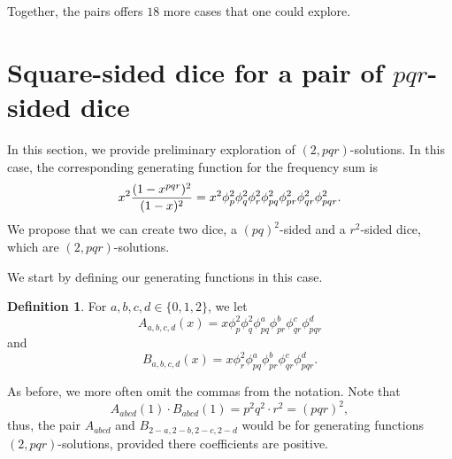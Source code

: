 \documentclass[11pt]{amsart}
\numberwithin{equation}{section}
\theoremstyle{plain}
\theoremstyle{definition}
\newtheorem{definition}[equation]{Definition}
\begin{document}
Together, the pairs offers $18$ more cases that one could explore. 






\section{Square-sided dice for a pair of $pqr$-sided dice}\label{sec:pqr}
In this section, we provide preliminary exploration of $(2,pqr)$-solutions. In this case, the corresponding generating function for the frequency sum is
$$x^2{(1-x^{pqr})^2\over (1-x)^2}=x^2\phi_p^2\phi_q^2\phi_r^2\phi_{pq}^2\phi_{pr}^2\phi_{qr}^2\phi_{pqr}^2.$$
We propose that we can create two dice, a $(pq)^2$-sided and a $r^2$-sided dice, which are $(2,pqr)$-solutions. 

We start by defining our generating functions in this case.

\begin{definition}
For $a,b,c,d\in \{0,1,2\}$, we let
$$A_{a,b,c,d}(x)=x\phi_p^2\phi_q^2\phi_{pq}^a\phi_{pr}^b\phi_{qr}^c\phi_{pqr}^d$$
and
$$B_{a,b,c,d}(x)=x\phi_r^2\phi_{pq}^a\phi_{pr}^b\phi_{qr}^c \phi_{pqr}^d.$$

\end{definition}
\noindent As before, we more often omit the commas from the notation.
Note that \[A_{abcd}(1)\cdot B_{abcd}(1)=p^2q^2\cdot r^2=(pqr)^2,\] thus, the pair $A_{abcd}$ and $B_{2-a,2-b,2-c,2-d}$ would be for generating functions $(2,pqr)$-solutions, provided there coefficients are positive. 


\end{document}

